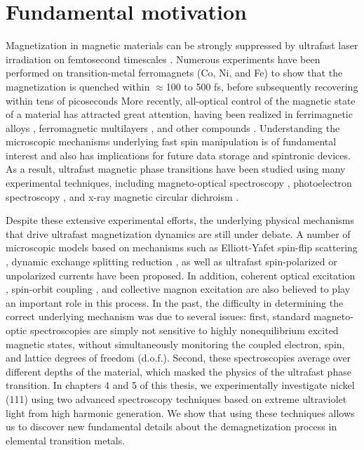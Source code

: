 \section{Fundamental motivation}

Magnetization in magnetic materials can be strongly suppressed by ultrafast laser irradiation on femtosecond timescales \cite{E.BeaupaireJ-CMerleA.Daunois1996}. Numerous experiments have been performed on transition-metal ferromagnets (Co, Ni, and Fe) to show that the magnetization is quenched within $\approx$100 to 500 fs, before subsequently recovering within tens of picoseconds \cite{Carley2012, Carpene2015, Eich2017, Koopmans2005,La-O-Vorakiat2009, Mathias2012, Rhie2003, Roth2012, Stamm2007,Turgut2016} More recently, all-optical control of the magnetic state of a material has attracted great attention, having been realized in ferrimagnetic alloys \cite{Turgut2016}, ferromagnetic multilayers \cite{Lambert2014}, and other compounds \cite{Kimmel2005}. Understanding the microscopic mechanisms underlying fast spin manipulation is of fundamental interest and also has implications for future data storage and spintronic devices. As a result, ultrafast magnetic phase transitions have been studied using many experimental techniques, including magneto-optical spectroscopy \cite{Carpene2015,Koopmans2005,La-O-Vorakiat2009,Mathias2012,Roth2012,Turgut2016}, photoelectron spectroscopy \cite{Carley2012,Eich2017,Rhie2003}, and x-ray magnetic circular dichroism \cite{Stamm2007,Boeglin2010}.

Despite these extensive experimental efforts, the underlying physical mechanisms that drive ultrafast magnetization dynamics are still under debate. A number of microscopic models based on mechanisms such as Elliott-Yafet spin-flip scattering \cite{Koopmans2005,Koopmans2010}, dynamic exchange splitting reduction \cite{Mueller2011,Mueller2013,Krauß2009}, as well as ultrafast spin-polarized or unpolarized currents \cite{Battiato2010,Eschenlohr2013} have been proposed. In addition, coherent optical excitation \cite{Bigot2009}, spin-orbit coupling \cite{Tows2015,Zhang2000}, and collective magnon excitation \cite{Carpene2015,Zhang2012,Schmidt2010} are also believed to play an important role in this process. In the past, the difficulty in determining the correct underlying mechanism was due to several issues: first, standard magneto-optic spectroscopies are simply not sensitive to highly nonequilibrium excited magnetic states, without simultaneously monitoring the coupled electron, spin, and lattice degrees of freedom (d.o.f.). Second, these spectroscopies average over different depths of the material, which masked the physics of the ultrafast phase transition. In chapters 4 and 5 of this thesis, we experimentally investigate nickel (111) using two advanced spectroscopy techniques based on extreme ultraviolet light from high harmonic generation. We show that using these techniques allows us to discover new fundamental details about the demagnetization process in elemental transition metals.

